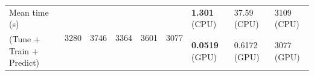 \begin{tabular}{@{\hskip 0mm}
l@{\hskip 1mm}
l@{\hskip 1mm}
l@{\hskip 1mm}
l@{\hskip 1mm}
l@{\hskip 1mm}
l@{\hskip 1mm}
l@{\hskip 1mm}
l@{\hskip 1mm}
l@{\hskip 0mm}}
\midrule
Mean time (s) 
                                    &            \multirow{2}{*}{3280} &            \multirow{2}{*}{3746} &            \multirow{2}{*}{3364} &            \multirow{2}{*}{3601} &                    \multirow{2}{*}{3077} &  \textbf{1.301} (CPU) &           37.59 (CPU) &                      3109 (CPU) \\
(Tune + Train + Predict)                                                                        &             &             &             &             &                     &  \textbf{0.0519} (GPU) &           0.6172 (GPU) &                      3077 (GPU) \\
\bottomrule
\end{tabular}